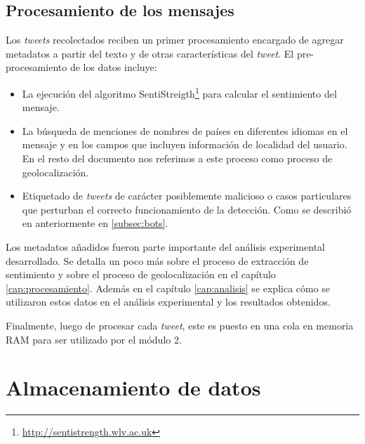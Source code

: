 \subsection{Procesamiento de los mensajes}
Los \textit{tweets} recolectados reciben un primer procesamiento encargado de agregar metadatos a partir del texto y de otras características del \textit{tweet}. El pre-procesamiento de los datos incluye:
\begin{itemize}
\item La ejecución del algoritmo SentiStreigth\footnote{\url{http://sentistrength.wlv.ac.uk}} para calcular el sentimiento del mensaje.
\item La búsqueda de menciones de nombres de países en diferentes idiomas en el mensaje y en los campos que incluyen información de localidad del usuario. En el resto del documento nos referimos a este proceso como proceso de geolocalización.
\item Etiquetado de \textit{tweets} de carácter posiblemente malicioso o casos particulares que perturban el correcto funcionamiento de la detección. Como se describió en anteriormente en \ref{subsec:bots}.%
\end{itemize}

Los metadatos añadidos fueron parte importante del análisis experimental desarrollado. Se detalla un poco más sobre el proceso de extracción de sentimiento y sobre el proceso de geolocalización en el capítulo \ref{cap:procesamiento}. Además en el capítulo \ref{cap:analisis} se explica cómo se utilizaron estos datos en el análisis experimental y los resultados obtenidos.

Finalmente, luego de procesar cada \textit{tweet}, este es puesto en una cola en memoria RAM para ser utilizado por el módulo 2.

\section{Almacenamiento de datos}

